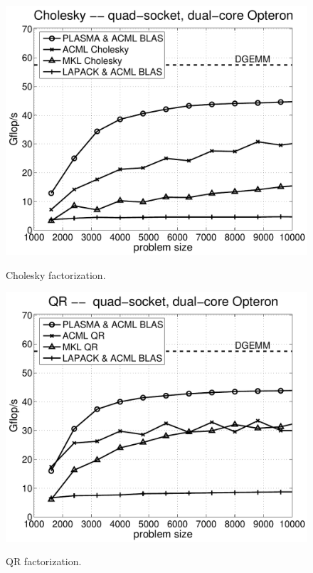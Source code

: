 \documentclass{article}
\begin{document}
\begin{figure}
\begin{minipage}[tl]{0.5\textwidth}
\begin{center}
{\includegraphics[width=1\textwidth]{images/sb_chol}}
\caption{\label{fig:chol} Cholesky factorization.}
\end{center}
\end{minipage}
\hspace{0.25cm}
\begin{minipage}[tr]{0.5\textwidth}
\begin{center}
{\includegraphics[width=1\textwidth]{images/sb_qr}}
\caption{\label{fig:qr} QR factorization.}
\end{center}
\end{minipage}
\end{figure}
\end{document}
